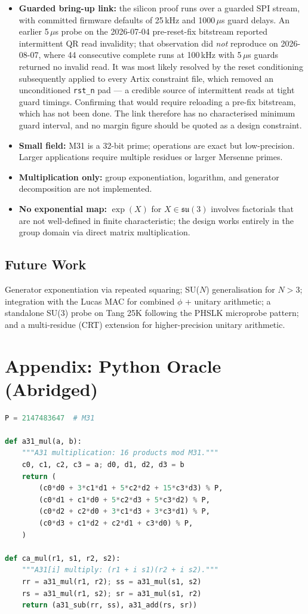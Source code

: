 \documentclass[conference]{IEEEtran}
\begin{document}
\begin{itemize}
\item \textbf{Guarded bring-up link:} the silicon proof runs over a guarded
SPI stream, with committed firmware defaults of 25\,kHz and 1000\,$\mu$s guard
delays. An earlier 5\,$\mu$s probe on the 2026-07-04 pre-reset-fix bitstream
reported intermittent QR read invalidity; that observation did \emph{not}
reproduce on 2026-08-07, where 44 consecutive complete runs at 100\,kHz with
5\,$\mu$s guards returned no invalid read. It was most likely resolved by the
reset conditioning subsequently applied to every Artix constraint file, which
removed an unconditioned \texttt{rst\_n} pad --- a credible source of
intermittent reads at tight guard timings. Confirming that would require
reloading a pre-fix bitstream, which has not been done. The link therefore has
no characterised minimum guard interval, and no margin figure should be quoted
as a design constraint.
\item \textbf{Small field:} M31 is a 32-bit prime; operations are exact but
low-precision. Larger applications require multiple residues or larger
Mersenne primes.
\item \textbf{Multiplication only:} group exponentiation, logarithm, and
generator decomposition are not implemented.
\item \textbf{No exponential map:} $\exp(X)$ for
$X \in \mathfrak{su}(3)$ involves factorials that are not well-defined in
finite characteristic; the design works entirely in the group domain via
direct matrix multiplication.
\end{itemize}

\subsection{Future Work}

Generator exponentiation via repeated squaring; SU($N$) generalisation for
$N > 3$; integration with the Lucas MAC for combined $\phi$ + unitary
arithmetic; a standalone SU(3) probe on Tang 25K following the PHSLK
microprobe pattern; and a multi-residue (CRT) extension for
higher-precision unitary arithmetic.

\section*{Appendix: Python Oracle (Abridged)}

\begin{lstlisting}[language=Python]
P = 2147483647  # M31

def a31_mul(a, b):
    """A31 multiplication: 16 products mod M31."""
    c0, c1, c2, c3 = a; d0, d1, d2, d3 = b
    return (
        (c0*d0 + 3*c1*d1 + 5*c2*d2 + 15*c3*d3) % P,
        (c0*d1 + c1*d0 + 5*c2*d3 + 5*c3*d2) % P,
        (c0*d2 + c2*d0 + 3*c1*d3 + 3*c3*d1) % P,
        (c0*d3 + c1*d2 + c2*d1 + c3*d0) % P,
    )

def ca_mul(r1, s1, r2, s2):
    """A31[i] multiply: (r1 + i s1)(r2 + i s2)."""
    rr = a31_mul(r1, r2); ss = a31_mul(s1, s2)
    rs = a31_mul(r1, s2); sr = a31_mul(s1, r2)
    return (a31_sub(rr, ss), a31_add(rs, sr))
\end{lstlisting}
\end{document}
